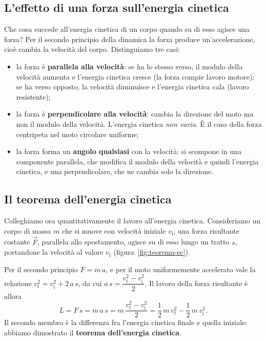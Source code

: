 \subsection{L'effetto di una forza sull'energia cinetica}

Che cosa succede all'energia cinetica di un corpo quando su di esso agisce una forza? Per il secondo principio della dinamica la forza produce un'accelerazione, cioè cambia la velocità del corpo. Distinguiamo tre casi:
\begin{itemize}
    \item la forza è \textbf{parallela alla velocità}: se ha lo stesso verso, il modulo della velocità aumenta e l'energia cinetica cresce (la forza compie lavoro motore); se ha verso opposto, la velocità diminuisce e l'energia cinetica cala (lavoro resistente);
    \item la forza è \textbf{perpendicolare alla velocità}: cambia la direzione del moto ma non il modulo della velocità. L'energia cinetica \emph{non varia}. È il caso della forza centripeta nel moto circolare uniforme;
    \item la forza forma un \textbf{angolo qualsiasi} con la velocità: si scompone in una componente parallela, che modifica il modulo della velocità e quindi l'energia cinetica, e una perpendicolare, che ne cambia solo la direzione.
\end{itemize}

\subsection{Il teorema dell'energia cinetica}

Colleghiamo ora quantitativamente il lavoro all'energia cinetica. Consideriamo un corpo di massa $m$ che si muove con velocità iniziale $v_\text{i}$; una forza risultante costante $\vec F$, parallela allo spostamento, agisce su di esso lungo un tratto $s$, portandone la velocità al valore $v_\text{f}$ (figura~\ref{fig:teorema-ec}).

Per il secondo principio $F = m\,a$, e per il moto uniformemente accelerato vale la relazione $v_\text{f}^2 = v_\text{i}^2 + 2\,a\,s$, da cui $a\,s = \dfrac{v_\text{f}^2 - v_\text{i}^2}{2}$. Il lavoro della forza risultante è allora
\[ L = F\,s = m\,a\,s = m\,\frac{v_\text{f}^2 - v_\text{i}^2}{2} = \frac{1}{2}\,m\,v_\text{f}^2 - \frac{1}{2}\,m\,v_\text{i}^2. \]
Il secondo membro è la differenza fra l'energia cinetica finale e quella iniziale: abbiamo dimostrato il \textbf{teorema dell'energia cinetica}.

